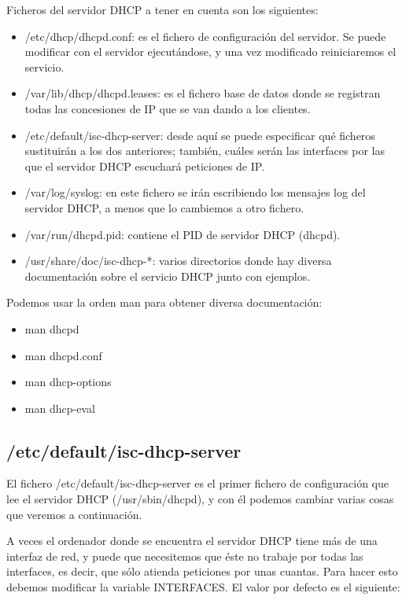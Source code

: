 Ficheros del servidor DHCP a tener en cuenta son los siguientes:
	\begin{itemize}
		\item /etc/dhcp/dhcpd.conf: es el fichero de configuración del servidor. Se puede modificar con el servidor ejecutándose, y una vez modificado reiniciaremos el servicio.
		\item /var/lib/dhcp/dhcpd.leases: es el fichero base de datos donde se registran todas las concesiones de IP que se van dando a los clientes.
		\item /etc/default/isc-dhcp-server: desde aquí se puede especificar qué ficheros sustituirán a los dos anteriores; también, cuáles serán las interfaces por las que el servidor DHCP escuchará peticiones de IP.
		\item /var/log/syslog: en este fichero se irán escribiendo los mensajes log del servidor DHCP, a menos que lo cambiemos a otro fichero.
		\item /var/run/dhcpd.pid: contiene el PID de servidor DHCP (dhcpd).
		\item /usr/share/doc/isc-dhcp-*: varios directorios donde hay diversa documentación sobre el servicio DHCP junto con ejemplos.
	\end{itemize}		

Podemos usar la orden man para obtener diversa documentación:

	\begin{itemize}
		\item man dhcpd
		\item man dhcpd.conf
		\item man dhcp-options
		\item man dhcp-eval
	\end{itemize}		

\subsection{/etc/default/isc-dhcp-server}
El fichero /etc/default/isc-dhcp-server es el primer fichero de configuración que lee el servidor DHCP (/usr/sbin/dhcpd), y con él podemos cambiar varias cosas que veremos a continuación.

A veces el ordenador donde se encuentra el servidor DHCP tiene más de una interfaz de red, y puede que necesitemos que éste no trabaje por todas las interfaces, es decir, que sólo atienda peticiones por unas cuantas. Para hacer esto debemos modificar la variable INTERFACES. El valor por defecto es el siguiente:

